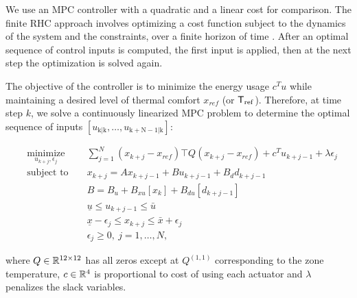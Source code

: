 We use an MPC controller with a quadratic and a linear cost for comparison.
The finite RHC approach involves optimizing a cost function subject to the dynamics of the system and the constraints, over a finite horizon of time \cite{Mayne2000}. After an optimal sequence of control inputs is computed, the first input is applied, then at the next step the optimization is solved again.


The objective of the controller is to minimize the energy usage $c^Tu$ while maintaining a desired level of thermal comfort $x_{ref}$ (or $\mathsf{T}_\mathrm{ref}$).
Therefore, at time step $k$, we solve a continuously linearized MPC problem to determine the optimal sequence of inputs $[u_{\mathrm{k|k}},\dots,u_{\mathrm{k+N-1|k}}]$:

\begin{subequations}
	\begin{align}
		& \underset{u_{k+j},\epsilon_j}{\text{minimize}} & & \sum_{j=1}^{N} ({x}_{k+j} - x_{ref})\top Q ({x}_{k+j} - x_{ref}) + c^Tu_{k+j-1} +  \lambda\epsilon_j \\
		& \text{subject to }                             & & x_{k+j} = Ax_{k+j-1} + B u_{k+j-1} + B_d d_{k+j-1} \label{SE:mpc1}                                   \\
		&                                                & & B       = B_u + B_{xu}[x_{k}] + B_{du}[d_{k+j-1}] \label{SE:mpc2}                                    \\
		&                                                & & \underline{u} \leq u_{k+j-1} \leq \bar{u} 									   	                      \\
		&                                                & & \underline{x} - \epsilon_j \leq x_{k+j} \leq \bar{x} + \epsilon_j                                    \\
		&                                                & & \epsilon_j \geq 0, \ j = 1,\dots,N,            									                 
	\end{align}\label{E:mpc}
\end{subequations} 

\noindent where $Q \in \mathbb{R}^{12 \times 12}$ has all zeros except at $Q^{(1,1)}$ corresponding to the zone temperature, $c \in \mathbb{R}^{4}$ is proportional to cost of using each actuator and $\lambda$ penalizes the slack variables.